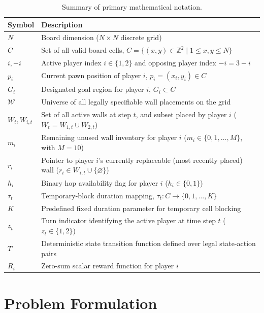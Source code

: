 \documentclass{article}
\begin{document}
\begin{table}[htbp]
\centering
\caption{Summary of primary mathematical notation.}
\label{tab:notation}
\begin{tabular}{lp{10.5cm}}
\toprule
\textbf{Symbol} & \textbf{Description} \\
\midrule
$N$ & Board dimension ($N \times N$ discrete grid) \\
$C$ & Set of all valid board cells, $C = \{(x, y) \in \mathbb{Z}^2 \mid 1 \le x, y \le N\}$ \\
$i, -i$ & Active player index $i \in \{1, 2\}$ and opposing player index $-i = 3 - i$ \\
$p_i$ & Current pawn position of player $i$, $p_i = (x_i, y_i) \in C$ \\
$G_i$ & Designated goal region for player $i$, $G_i \subset C$ \\
$\mathcal{W}$ & Universe of all legally specifiable wall placements on the grid \\
$W_t, W_{i,t}$ & Set of all active walls at step $t$, and subset placed by player $i$ ($W_t = W_{1,t} \cup W_{2,t}$) \\
$m_i$ & Remaining unused wall inventory for player $i$ ($m_i \in \{0, 1, \dots, M\}$, with $M = 10$) \\
$r_i$ & Pointer to player $i$'s currently replaceable (most recently placed) wall ($r_i \in W_{i,t} \cup \{\varnothing\}$) \\
$h_i$ & Binary hop availability flag for player $i$ ($h_i \in \{0, 1\}$) \\
$\tau_t$ & Temporary-block duration mapping, $\tau_t : C \rightarrow \{0, 1, \dots, K\}$ \\
$K$ & Predefined fixed duration parameter for temporary cell blocking \\
$z_t$ & Turn indicator identifying the active player at time step $t$ ($z_t \in \{1, 2\}$) \\
$T$ & Deterministic state transition function defined over legal state-action pairs \\
$R_i$ & Zero-sum scalar reward function for player $i$ \\
\bottomrule
\end{tabular}
\end{table}

\section{Problem Formulation}
\label{sec:problem_formulation}
\end{document}
